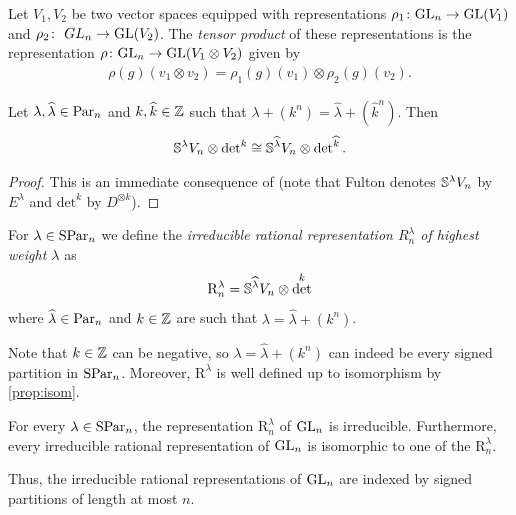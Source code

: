 \documentclass[11pt]{amsart}
\begin{document}
    \begin{defin}
    Let $V_1, V_2$ be two vector spaces equipped with representations $\rho_1 \colon \mathrm{GL}_n \rightarrow \mathrm{GL}(V_1) $ and $\rho_2 \colon \ GL_n \rightarrow \mathrm{GL}(V_2) $. The \emph{tensor product} of these representations is the representation $\rho \colon \mathrm{GL}_n \rightarrow \mathrm{GL}(V_1 \otimes V_2)$ given by 
    \begin{align}
        \rho(g) (v_1 \otimes v_2) = \rho_1(g)(v_1) \otimes \rho_2(g)(v_2).
    \end{align}
\end{defin}

\begin{prop}\label{prop:isom}
    Let $\lambda, \widehat{\lambda} \in \mathrm{Par}_n$ and $k,\widehat{k} \in \mathbb{Z}$ such that $\lambda + (k^n) = \widehat{\lambda} + (\widehat{k}^n) $. Then 
    \begin{align}
        \mathbb{S}^\lambda V_n\otimes \det\nolimits^k \cong
        \mathbb{S}^{\widehat{\lambda}} V_n \otimes \det\nolimits^{\widehat{k}}.
    \end{align}
\end{prop}
\begin{proof}
    This is an immediate consequence of \cite[\S 8.2, Th.~2]{Ful97} (note that Fulton denotes $\mathbb{S}^\lambda V_n$ by $E^\lambda$ and $\mathrm{det}^k$ by $D^{\otimes k}$).   
\end{proof}

    \begin{defin}\label{def:elratrep}
    For \(\lambda \in \mathrm{SPar}_n\) we define the \emph{irreducible rational representation $R_n^\lambda$ of highest weight $\lambda$} as 
    \begin{equation}
        \mathrm{R}_n^\lambda = \mathbb{S}^{\widehat{\lambda}} V_n \otimes \det^k \label{eq:turquoise}
    \end{equation}
    where \(\widehat{\lambda} \in \mathrm{Par}_n\) and \(k \in \mathbb{Z}\) are such that \(\lambda = \widehat{\lambda} + (k^n)\). 
\end{defin}

Note that $k \in \mathbb{Z}$ can be negative, so $\lambda=\widehat{\lambda}+(k^n)$ can indeed be every signed partition in $\mathrm{SPar}_n$. Moreover, $\mathrm{R}^\lambda$ is well defined up to isomorphism by \cref{prop:isom}. 

\begin{prop}
    For every \(\lambda \in \mathrm{SPar}_n\), the representation \(\mathrm{R}_n^\lambda\) of \(\mathrm{GL}_n\) is irreducible. Furthermore, every irreducible rational representation of \(\mathrm{GL}_n\) is isomorphic to one of the \(\mathrm{R}_n^\lambda\).
\end{prop}
Thus, the irreducible rational representations of $\mathrm{GL}_n$ are indexed by signed partitions of length at most $ n$.
\end{document}
